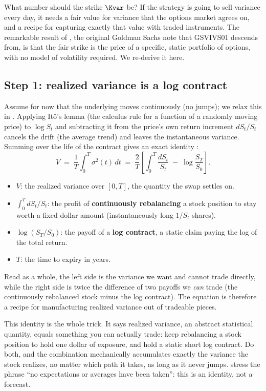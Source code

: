 What number should the strike $\Kvar$ be? If the strategy is going to sell variance every day, it needs a fair value for variance that the options market agrees on, and a recipe for capturing exactly that value with traded instruments. The remarkable result of \citet{Demeterfi1999}, the original Goldman Sachs note that GSVIVS01 descends from, is that the fair strike is the price of a specific, static portfolio of options, with no model of volatility required. We re-derive it here.

\subsection*{Step 1: realized variance is a log contract}

Assume for now that the underlying moves continuously (no jumps); we relax this in . Applying It\^o's lemma (the calculus rule for a function of a randomly moving price) to $\log S_t$ and subtracting it from the price's own return increment $dS_t/S_t$ cancels the drift (the average trend) and leaves the instantaneous variance. Summing over the life of the contract gives an exact identity \citep[Eq.~20, p.~17]{Demeterfi1999}:
\begin{equation}
\label{eq:gsvivs:logcontract}
V \;=\; \frac{1}{T}\int_0^T \sigma^2(t)\,dt \;=\; \frac{2}{T}\left[\int_0^T \frac{dS_t}{S_t} \;-\; \log\frac{S_T}{S_0}\right].
\end{equation}
\begin{itemize}
  \item $V$: the realized variance over $[0,T]$, the quantity the swap settles on.
  \item $\int_0^T dS_t/S_t$: the profit of \textbf{continuously rebalancing} a stock position to stay worth a fixed dollar amount (instantaneously long $1/S_t$ shares).
  \item $\log(S_T/S_0)$: the payoff of a \textbf{log contract}, a static claim paying the log of the total return.
  \item $T$: the time to expiry in years.
\end{itemize}
Read as a whole, the left side is the variance we want and cannot trade directly, while the right side is twice the difference of two payoffs we \emph{can} trade (the continuously rebalanced stock minus the log contract). The equation is therefore a recipe for manufacturing realized variance out of tradeable pieces.

\begin{intuition}
This identity is the whole trick. It says realized variance, an abstract statistical quantity, equals something you can actually trade: keep rebalancing a stock position to hold one dollar of exposure, and hold a static short log contract. Do both, and the combination mechanically accumulates exactly the variance the stock realizes, no matter which path it takes, as long as it never jumps. \citet{Demeterfi1999} stress the phrase ``no expectations or averages have been taken'': this is an identity, not a forecast.
\end{intuition}

